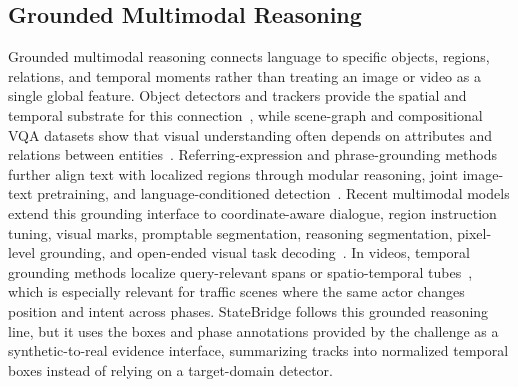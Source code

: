 \documentclass[runningheads]{llncs}
\begin{document}
\subsection{Grounded Multimodal Reasoning}
Grounded multimodal reasoning connects language to specific objects, regions, relations, and temporal moments rather than treating an image or video as a single global feature. Object detectors and trackers provide the spatial and temporal substrate for this connection~\cite{ren2015fasterrcnn,carion2020detr,zhu2021deformabledetr,zhang2022bytetrack}, while scene-graph and compositional VQA datasets show that visual understanding often depends on attributes and relations between entities~\cite{visualgenome2017,hudson2019gqa}. Referring-expression and phrase-grounding methods further align text with localized regions through modular reasoning, joint image-text pretraining, and language-conditioned detection~\cite{kazemzadeh2014referitgame,yu2018mattnet,lu2019vilbert,chen2020uniter,kamath2021mdetr,li2022glip,minderer2022owlvit,liu2023groundingdino}. Recent multimodal models extend this grounding interface to coordinate-aware dialogue, region instruction tuning, visual marks, promptable segmentation, reasoning segmentation, pixel-level grounding, and open-ended visual task decoding~\cite{peng2023kosmos2,chen2023shikra,zhang2023gpt4roi,you2023ferret,yang2023setofmark,kirillov2023sam,zou2023seem,lai2024lisa,rasheed2024glamm,wang2023visionllm,qwen3vl}. In videos, temporal grounding methods localize query-relevant spans or spatio-temporal tubes~\cite{zhang2020vslnet,zhang2020twodtan,lei2021momentdetr,yang2022tubedetr}, which is especially relevant for traffic scenes where the same actor changes position and intent across phases. StateBridge follows this grounded reasoning line, but it uses the boxes and phase annotations provided by the challenge as a synthetic-to-real evidence interface, summarizing tracks into normalized temporal boxes instead of relying on a target-domain detector.
\end{document}
